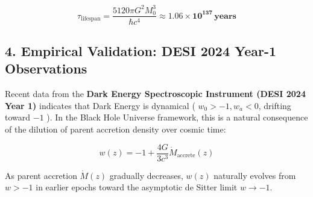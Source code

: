 \documentclass[11pt,a4paper]{article}
\theoremstyle{definition}
\theoremstyle{remark}
\begin{document}
\begin{equation}
\tau_{\text{lifespan}} = \frac{5120 \pi G^2 M_0^3}{\hbar c^4} \approx \mathbf{1.06 \times 10^{137} \, \text{years}}
\end{equation}


\subsection{4. Empirical Validation: DESI 2024 Year-1 Observations}
Recent data from the \textbf{Dark Energy Spectroscopic Instrument (DESI 2024 Year 1)} indicates that Dark Energy is dynamical ( $w_0 > -1, w_a < 0$, drifting toward $-1$ ). In the Black Hole Universe framework, this is a natural consequence of the dilution of parent accretion density over cosmic time:


\begin{equation}
w(z) = -1 + \frac{4G}{3 c^3} \dot{M}_{\text{accrete}}(z)
\end{equation}


As parent accretion $\dot{M}(z)$ gradually decreases, $w(z)$ naturally evolves from $w > -1$ in earlier epochs toward the asymptotic de Sitter limit $w \to -1$.
\end{document}
